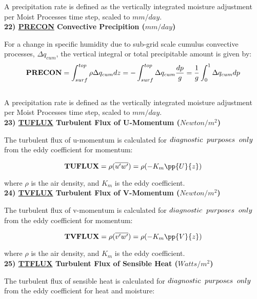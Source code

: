 \noindent
A precipitation rate is defined as the vertically integrated moisture adjustment per Moist Processes
time step, scaled to $mm/day$.
\\

\noindent
{\bf 22)  \underline {PRECON} Convective Precipition ($mm/day$) } 

\noindent
For a change in specific humidity due to sub-grid scale cumulus convective processes, $\Delta q_{cum}$, 
the vertical integral or total precipitable amount is given by:   
\[
{\bf PRECON} = \int_{surf}^{top} \rho \Delta q_{cum} dz = - \int_{surf}^{top} \Delta  q_{cum}
{dp \over g} = {1 \over g} \int_0^1 \Delta q_{cum} dp
\]
\\

\noindent
A precipitation rate is defined as the vertically integrated moisture adjustment per Moist Processes
time step, scaled to $mm/day$.
\\

\noindent
{\bf 23)  \underline {TUFLUX}  Turbulent Flux of U-Momentum ($Newton/m^2$) }

\noindent
The turbulent flux of u-momentum is calculated for $diagnostic \hspace{.2cm} purposes
 \hspace{.2cm} only$ from the eddy coefficient for momentum:

\[
{\bf TUFLUX} =  {\rho } {(\overline{u^{\prime}w^{\prime}})} =  
{\rho } {(- K_m \pp{U}{z})}
\]
 
\noindent
where $\rho$ is the air density, and $K_m$ is the eddy coefficient.
\\

\noindent
{\bf 24)  \underline {TVFLUX}  Turbulent Flux of V-Momentum ($Newton/m^2$) }

\noindent
The turbulent flux of v-momentum is calculated for $diagnostic \hspace{.2cm} purposes 
\hspace{.2cm} only$ from the eddy coefficient for momentum:

\[
{\bf TVFLUX} =  {\rho } {(\overline{v^{\prime}w^{\prime}})} = 
 {\rho } {(- K_m \pp{V}{z})}
\]
 
\noindent
where $\rho$ is the air density, and $K_m$ is the eddy coefficient.
\\


\noindent
{\bf 25)  \underline {TTFLUX}  Turbulent Flux of Sensible Heat ($Watts/m^2$) }

\noindent
The turbulent flux of sensible heat is calculated for $diagnostic \hspace{.2cm} purposes 
\hspace{.2cm} only$ from the eddy coefficient for heat and moisture:

